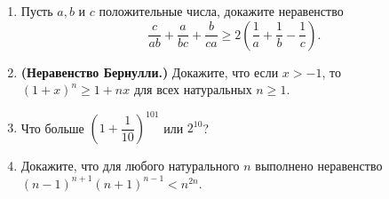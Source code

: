 \documentclass{article}
\begin{document}
\begin{enumerate}[label*=\protect\fbox{\arabic{enumi}}]
        \item Пусть $a, b$ и $c$ положительные числа, докажите неравенство
        \[\frac{c}{a b}+\frac{a}{b c}+\frac{b}{c a} \geqslant 2\left(\frac{1}{a}+\frac{1}{b}-\frac{1}{c}\right).\]

        \item \textbf{(Неравенство Бернулли.)} Докажите, что если $x>-1$, то $(1+x)^n\geqslant 1 + nx$ для всех натуральных $n\geqslant 1.$

        \item Что больше $\left(1+\dfrac{1}{10}\right)^{101}$ или $2^{10}$?

        \item Докажите, что для любого натурального $n$ выполнено неравенство  \\$(n - 1)^{n+1}(n + 1)^{n-1}< n^{2n}$.

    \end{enumerate}
\end{document}
